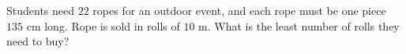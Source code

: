 Students need $22$ ropes for an outdoor event, and each rope must be one piece $135$ cm long. Rope is sold in rolls of $10$ m. What is the least number of rolls they need to buy?
